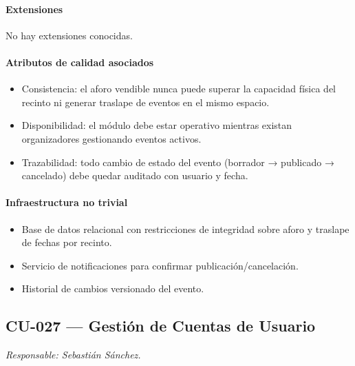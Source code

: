 \paragraph{Extensiones}
No hay extensiones conocidas.

\paragraph{Atributos de calidad asociados}
\begin{itemize}[leftmargin=1.4em, topsep=1pt]
  \item Consistencia: el aforo vendible nunca puede superar la capacidad física del recinto ni generar traslape de eventos en el mismo espacio.
  \item Disponibilidad: el módulo debe estar operativo mientras existan organizadores gestionando eventos activos.
  \item Trazabilidad: todo cambio de estado del evento (borrador → publicado → cancelado) debe quedar auditado con usuario y fecha.
\end{itemize}

\paragraph{Infraestructura no trivial}
\begin{itemize}[leftmargin=1.4em, topsep=1pt]
  \item Base de datos relacional con restricciones de integridad sobre aforo y traslape de fechas por recinto.
  \item Servicio de notificaciones para confirmar publicación/cancelación.
  \item Historial de cambios versionado del evento.
\end{itemize}

\subsection{CU-027 --- Gestión de Cuentas de Usuario}
\label{cu:cu-027}
\textit{Responsable: Sebastián Sánchez.}


